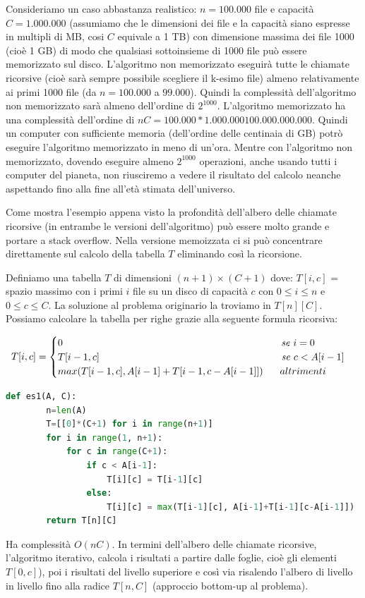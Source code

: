 Consideriamo un caso abbastanza realistico: $n = 100.000$ file e capacità $C = 1.000.000$ (assumiamo che le dimensioni dei file e la capacità siano espresse in multipli di MB, cosi $C$ equivale a 1 TB) con dimensione massima dei file 1000 (cioè 1 GB) di modo che qualsiasi sottoinsieme di 1000 file può essere memorizzato sul disco.
L'algoritmo non memorizzato eseguirà tutte le chiamate ricorsive (cioè sarà sempre possibile scegliere il k-esimo file) almeno relativamente ai primi 1000 file (da $n = 100.000$ a $99.000$). Quindi la complessità dell'algoritmo non memorizzato sarà almeno dell'ordine di $2^{1000}$. L'algoritmo memorizzato ha una complessità dell'ordine di $nC = 100.000 * 1.000.000 100.000.000.000$.
Quindi un computer con sufficiente memoria (dell'ordine delle centinaia di GB) potrò eseguire l'algoritmo memorizzato in meno di un'ora. Mentre con l'algoritmo non memorizzato, dovendo eseguire almeno $2^{1000}$ operazioni, anche usando tutti i computer del pianeta, non riusciremo a vedere il risultato del calcolo neanche aspettando fino alla fine all'età stimata dell'universo.

Come mostra l'esempio appena visto la profondità dell'albero delle chiamate ricorsive (in entrambe le versioni dell'algoritmo) può essere molto grande e portare a stack overflow. Nella versione memoizzata ci si può concentrare direttamente sul calcolo della tabella $T$ eliminando così la ricorsione.

Definiamo una tabella $T$ di dimensioni $(n + 1)\times (C + 1)$ dove: $T[i, c]$ = spazio massimo con i primi $i$ file su un disco di capacità $c$ con $0\leq i \leq n$ e $0 \leq c \leq C$. La soluzione al problema originario la troviamo in $T[n][C]$. Possiamo calcolare la tabella per righe grazie alla seguente formula ricorsiva:

\begin{equation*}
    T[i, c]=
    \begin{cases}
        0\hspace{7.8cm}\textit{se }i=0\\
        T[i-1, c]\hspace{6.5cm}\textit{se }c<A[i-1]\\
        max(T[i-1, c], A[i - 1] + T[i-1, c - A[i - 1]])\hspace{.6cm} altrimenti
    \end{cases}
\end{equation*}

\begin{lstlisting}[language=Python]
    def es1(A, C):
        n=len(A)
        T=[[0]*(C+1) for i in range(n+1)]
        for i in range(1, n+1):
            for c in range(C+1):
                if c < A[i-1]:
                    T[i][c] = T[i-1][c]
                else:
                    T[i][c] = max(T[i-1][c], A[i-1]+T[i-1][c-A[i-1]])
        return T[n][C]
\end{lstlisting}
Ha complessità $O(nC)$. In termini dell'albero delle chiamate ricorsive, l'algoritmo iterativo, calcola i risultati a partire dalle foglie, cioè gli elementi $T[0, c]$), poi i risultati del livello superiore e così via risalendo l'albero di livello in livello fino alla radice $T[n, C]$ (approccio bottom-up al problema).
 
